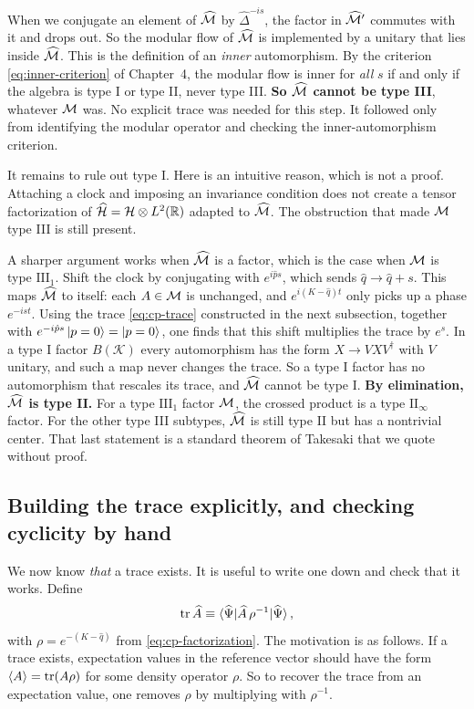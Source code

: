 When we conjugate an element of $\widehat{\mathcal{M}}$ by $\widehat\Delta^{-is}$, the factor in $\widehat{\mathcal{M}}'$ commutes
with it and drops out. So the modular flow of $\widehat{\mathcal{M}}$ is implemented by a unitary that lies inside
$\widehat{\mathcal{M}}$. This is the definition of an \emph{inner} automorphism. By the criterion
\eqref{eq:inner-criterion} of Chapter~4, the modular flow is inner for \emph{all} $s$ if and only if the
algebra is type I or type II, never type III. \textbf{So $\widehat{\mathcal{M}}$ cannot be type III}, whatever $\mathcal{M}$ was.
No explicit trace was needed for this step. It followed only from identifying the modular operator and checking
the inner-automorphism criterion.

It remains to rule out type I. Here is an intuitive reason, which is not a proof. Attaching a clock and
imposing an invariance condition does not create a tensor factorization of $\widehat{\mathcal{H}}=\mathcal{H}\otimes
L^2(\mathbb R)$ adapted to $\widehat{\mathcal{M}}$. The obstruction that made $\mathcal{M}$ type III is still present.

A sharper argument works when $\widehat{\mathcal{M}}$ is a factor, which is the case when $\mathcal{M}$ is type $\mathrm{III}_1$.
Shift the clock by conjugating with $e^{i\hat ps}$, which sends $\hat q\to\hat q+s$. This maps $\widehat{\mathcal{M}}$ to
itself: each $A\in\mathcal{M}$ is unchanged, and $e^{i(K-\hat q)t}$ only picks up a phase $e^{-ist}$. Using the trace
\eqref{eq:cp-trace} constructed in the next subsection, together with $e^{-i\hat ps}\ket{p=0}=\ket{p=0}$, one
finds that this shift multiplies the trace by $e^{s}$. In a type I factor $B(\mathcal K)$ every automorphism has
the form $X\to VXV^\dagger$ with $V$ unitary, and such a map never changes the trace. So a type I factor has no
automorphism that rescales its trace, and $\widehat{\mathcal{M}}$ cannot be type I. \textbf{By elimination, $\widehat{\mathcal{M}}$ is
type II.} For a type $\mathrm{III}_1$ factor $\mathcal{M}$, the crossed product is a type $\mathrm{II}_\infty$ factor.
For the other type III subtypes, $\widehat{\mathcal{M}}$ is still type II but has a nontrivial center. That last statement
is a standard theorem of Takesaki that we quote without proof.

\subsection*{Building the trace explicitly, and checking cyclicity by hand}

We now know \emph{that} a trace exists. It is useful to write one down and check that it works. Define
\begin{equation}
\operatorname{tr}\widehat A \equiv \braket{\widehat\Psi|\widehat A\,\rho^{-1}|\widehat\Psi} ,
\label{eq:cp-trace}
\end{equation}
with $\rho=e^{-(K-\hat q)}$ from \eqref{eq:cp-factorization}. The motivation is as follows. If a trace exists,
expectation values in the reference vector should have the form $\braket{A}=\operatorname{tr}(A\rho)$ for some density
operator $\rho$. So to recover the trace from an expectation value, one removes $\rho$ by multiplying with
$\rho^{-1}$.

